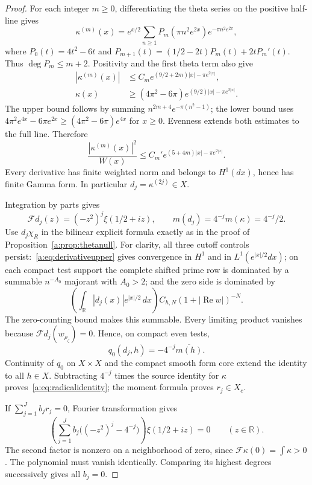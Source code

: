\documentclass[11pt,a4paper]{article}
\numberwithin{equation}{section}
\theoremstyle{definition}\newtheorem{definition}[theorem]{Definition}
\theoremstyle{remark}\newtheorem{remark}[theorem]{Remark}
\newcommand{\R}{\mathbb R}\newcommand{\C}{\mathbb C}\newcommand{\N}{\mathbb N}
\begin{document}
\begin{proof}
For each integer $m\ge0$, differentiating the theta series on the positive half-line gives
\[
 \kappa^{(m)}(x)=e^{x/2}\sum_{n\ge1}P_m(\pi n^2e^{2x})e^{-\pi n^2e^{2x}},
\]
where $P_0(t)=4t^2-6t$ and
$P_{m+1}(t)=(1/2-2t)P_m(t)+2tP_m'(t)$.
Thus $\deg P_m\le m+2$. Positivity and the first theta term also give
\begin{align}
 |\kappa^{(m)}(x)|&\le C_m
        e^{(9/2+2m)|x|-\pi e^{2|x|}},\label{a:eq:derivativeupper}\\
 \kappa(x)&\ge(4\pi^2-6\pi)
        e^{(9/2)|x|-\pi e^{2|x|}}.\label{a:eq:thetalower}
\end{align}
The upper bound follows by summing
$n^{2m+4}e^{-\pi(n^2-1)}$; the lower bound uses
$4\pi^2e^{4x}-6\pi e^{2x}\ge(4\pi^2-6\pi)e^{4x}$ for $x\ge0$.
Evenness extends both estimates to the full line. Therefore
\begin{equation}\label{a:eq:derivativeweighted}
 \frac{|\kappa^{(m)}(x)|^2}{W(x)}
 \le C_m'e^{(5+4m)|x|-\pi e^{2|x|}}.
\end{equation}
Every derivative has finite weighted norm and belongs to $H^1(dx)$, hence has finite Gamma form. In particular $d_j=\kappa^{(2j)}\in X$.

Integration by parts gives
\[
 \mathcal Fd_j(z)=(-z^2)^j\xi(1/2+iz),\qquad
 m(d_j)=4^{-j}m(\kappa)=4^{-j}/2.
\]
Use $d_j\chi_R$ in the bilinear explicit formula exactly as in the proof of Proposition~\ref{a:prop:thetanull}. For clarity, all three cutoff controls persist:~\eqref{a:eq:derivativeupper} gives convergence in $H^1$ and in $L^1(e^{|x|/2}dx)$; on each compact test support the complete shifted prime row is dominated by a summable $n^{-A_0}$ majorant with $A_0>2$; and the zero side is dominated by
\[
 \left(\int_\R|d_j(x)|e^{|x|/2}\,dx\right)
 C_{h,N}(1+|\operatorname{Re}w|)^{-N}.
\]
The zero-counting bound makes this summable. Every limiting product vanishes because $\mathcal Fd_j(w_{\rho_\zeta})=0$. Hence, on compact even tests,
\[
 q_0(d_j,h)=-4^{-j}\overline{m(h)}.
\]
Continuity of $q_0$ on $X\times X$ and the compact smooth form core extend the identity to all $h\in X$. Subtracting $4^{-j}$ times the source identity for $\kappa$ proves~\eqref{a:eq:radicalidentity}; the moment formula proves $r_j\in X_c$.

If $\sum_{j=1}^Jb_jr_j=0$, Fourier transformation gives
\[
 \left(\sum_{j=1}^Jb_j\bigl((-z^2)^j-4^{-j}\bigr)\right)
                 \xi(1/2+iz)=0\qquad(z\in\R).
\]
The second factor is nonzero on a neighborhood of zero, since
$\mathcal F\kappa(0)=\int\kappa>0$. The polynomial must vanish identically. Comparing its highest degrees successively gives all $b_j=0$.
\end{proof}
\end{document}
